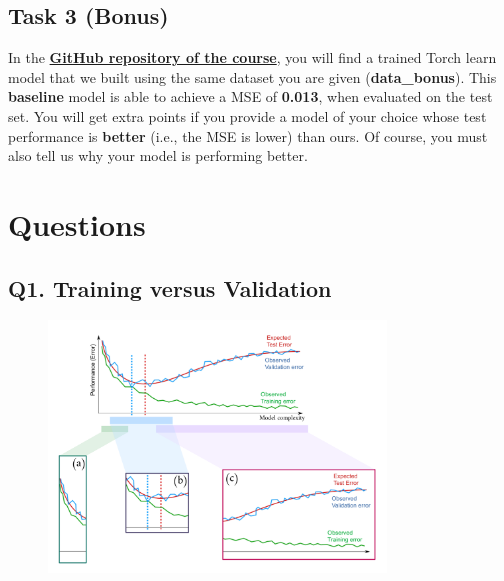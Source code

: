 \documentclass[11pt]{scrartcl}
\begin{document}
\subsection*{Task 3 (Bonus)}
In the \href{https://github.com/FatimaEzzedinee/ML-bachelor-course-assignments-sp24}{\textbf{GitHub repository of the course}}, you will find a trained Torch learn model that we built using the same dataset you are given (\textbf{data\_bonus}). 
This \textbf{baseline} model is able to achieve a MSE of \textbf{0.013}, when evaluated on the test set.
You will get extra points if you provide a model of your choice whose test performance is \textbf{better} (i.e., the MSE is lower) than ours. Of course, you must also tell us why your model is performing better.

\section*{Questions}

\subsection*{Q1. Training versus Validation}

\begin{figure}[htbp] %
    \centering
    \includegraphics[width=0.8\textwidth]{../ex_train_val_test.png}
\end{figure}
\end{document}
